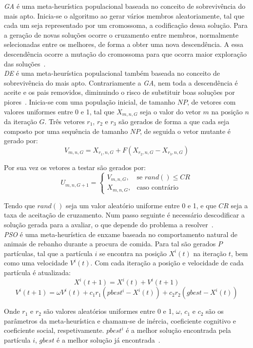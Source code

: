 \textit{GA} é uma meta-heurística populacional baseada no conceito de sobrevivência do mais apto. Inicia-se o algoritmo ao gerar vários membros aleatoriamente, tal que cada um seja representado por um cromossoma, a codificação dessa solução. Para a geração de novas soluções ocorre o cruzamento entre membros, normalmente selecionadas entre os melhores, de forma a obter uma nova descendência. A essa descendência ocorre a mutação do cromossoma para que ocorra maior exploração das soluções~\cite{katochReviewGeneticAlgorithm2021}.\\

\textit{DE} é uma meta-heurística populacional também baseada no conceito de sobrevivência do mais apto. Contrariamente a \textit{GA}, nem toda a descendência é aceite e os pais removidos, diminuindo o risco de substituir boas soluções por piores~\cite{shilpaJobShopScheduling2018}. Inicia-se com uma população inicial, de tamanho $NP$, de vetores com valores uniformes entre 0 e 1, tal que $X_{m,n,G}$ seja o valor do vetor $m$ na posição $n$ da iteração $G$. Três vetores $r_{1}$, $r_{2}$ e $r_{3}$ são gerados de forma a que cada seja composto por uma sequência de tamanho $NP$, de seguida o vetor mutante é gerado por:
$$V_{m,n,G}=X_{r_{1},n,G}+F(X_{r_{2},n,G}-X_{r_{3},n,G})$$

Por sua vez os vetores a testar são gerados por:
$$
U_{m,n,G+1}= 
\begin{cases}
	V_{m,n,G}   ,& \text{se } rand()\leq CR\\
    X_{m,n,G}   ,& \text{caso contrário}
\end{cases}
$$

Tendo que $rand()$ seja um valor aleatório uniforme entre 0 e 1, e que $CR$ seja a taxa de aceitação de cruzamento. Num passo seguinte é necessário descodificar a solução gerada para a avaliar, o que depende do problema a resolver~\cite{sriboonchandrImprovedDifferentialEvolution2019}.\\

\textit{PSO} é uma meta-heurística de enxame baseada no comportamento natural de animais de rebanho durante a procura de comida. Para tal são gerados $P$ partículas, tal que a partícula $i$ se encontra na posição $X^{i}(t)$ na iteração $t$, bem como uma velocidade $V^{i}(t)$. Com cada iteração a posição e velocidade de cada partícula é atualizada:
$$X^{i}(t+1)=X^{i}(t)+V^{i}(t+1)$$
$$V^{i}(t+1)=\omega V^{i}(t)+c_{1}r_{1}(pbest^{i}-X^{i}(t))+c_{2}r_{2}(gbest-X^{i}(t))$$

Onde $r_{1}$ e $r_{2}$ são valores aleatórios uniformes entre 0 e 1, $\omega$, $c_{1}$ e $c_{2}$ são os parâmetros da meta-heurística e chamam-se de inércia, coeficiente cognitivo e coeficiente social, respetivamente. $pbest^{i}$ é a melhor solução encontrada pela partícula $i$, $gbest$ é a melhor solução já encontrada~\cite{ParticleSwarmOptimization2025}.\\

